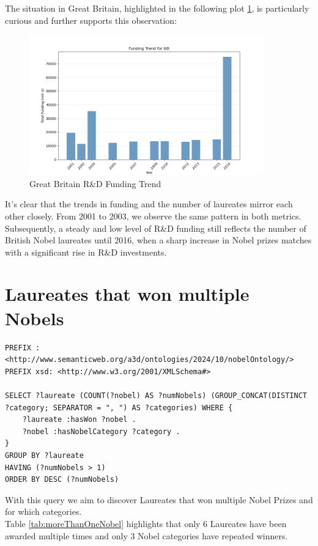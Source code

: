 \documentclass{article}
\begin{document}
The situation in Great Britain, highlighted in the following plot \ref{fig:gb_fundings}, is particularly curious
and further supports this observation:

\begin{figure}[H]
	\centering
	\includegraphics[width=0.9\textwidth]{../queries/plots/gb_funding_trend_bar.png}
	\caption{Great Britain R\&D Funding Trend}
	\label{fig:gb_fundings}
\end{figure}

It's clear that the trends in funding and the number of laureates mirror each other closely. From 2001 to 2003,
we observe the same pattern in both metrics. Subsequently, a steady and low level of R\&D funding still reflects
the number of British Nobel laureates until 2016, when a sharp increase in Nobel prizes matches with a significant
rise in R\&D investments.

\section{Laureates that won multiple Nobels}

\begin{lstlisting}
PREFIX : <http://www.semanticweb.org/a3d/ontologies/2024/10/nobelOntology/>
PREFIX xsd: <http://www.w3.org/2001/XMLSchema#>

SELECT ?laureate (COUNT(?nobel) AS ?numNobels) (GROUP_CONCAT(DISTINCT ?category; SEPARATOR = ", ") AS ?categories) WHERE {
    ?laureate :hasWon ?nobel .
    ?nobel :hasNobelCategory ?category .
}
GROUP BY ?laureate
HAVING (?numNobels > 1)
ORDER BY DESC (?numNobels)
\end{lstlisting}
With this query we aim to discover Laureates that won multiple Nobel Prizes and for which categories.\\
Table \ref{tab:moreThanOneNobel} highlights that only 6 Laureates have been awarded multiple times and only 3
Nobel categories have repeated winners.
\end{document}
